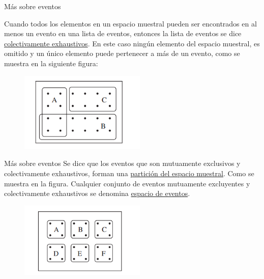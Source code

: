 \documentclass{beamer}
\begin{document}
\begin{frame}{M\'as sobre eventos}
	
Cuando todos los elementos en un espacio muestral pueden ser encontrados en al menos un evento en una lista de eventos, entonces la lista de eventos se dice \underline{colectivamente exhaustivos}. En este caso ning\'un elemento del espacio muestral, es omitido y un \'unico elemento puede pertenecer a m\'as de un evento, como se muestra en la siguiente figura:
	
	\vspace{0.2cm}
	
	\begin{figure}[!htb]
		\centering
		\includegraphics[width=6cm]{p4}
	\end{figure}
\end{frame}
\begin{frame}{M\'as sobre eventos}
Se dice que los eventos que son mutuamente exclusivos y colectivamente exhaustivos, forman una \underline{partici\'on del espacio muestral}. Como se muestra en la figura. 
Cualquier conjunto de eventos mutuamente excluyentes y colectivamente exhaustivos se denomina \underline{espacio de eventos}.

\vspace{0.2cm}

\begin{figure}[!htb]
	\centering
	\includegraphics[width=6cm]{p5}
\end{figure}

\end{frame}
\end{document}
